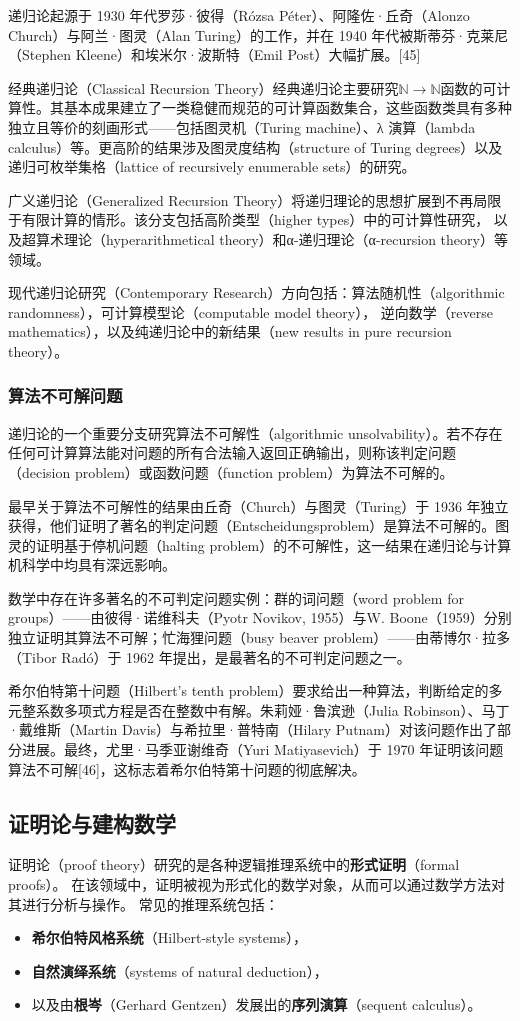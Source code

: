 递归论起源于 1930 年代罗莎·彼得（Rózsa Péter）、阿隆佐·丘奇（Alonzo Church）与阿兰·图灵（Alan Turing）的工作，并在 1940 年代被斯蒂芬·克莱尼（Stephen Kleene）和埃米尔·波斯特（Emil Post）大幅扩展。[45]

经典递归论（Classical Recursion Theory）经典递归论主要研究\(\mathbb{N} \to \mathbb{N}\)函数的可计算性。其基本成果建立了一类稳健而规范的可计算函数集合，这些函数类具有多种独立且等价的刻画形式——包括图灵机（Turing machine）、λ 演算（lambda calculus）等。更高阶的结果涉及图灵度结构（structure of Turing degrees）以及递归可枚举集格（lattice of recursively enumerable sets）的研究。

广义递归论（Generalized Recursion Theory）将递归理论的思想扩展到不再局限于有限计算的情形。该分支包括高阶类型（higher types）中的可计算性研究，
以及超算术理论（hyperarithmetical theory）和α-递归理论（α-recursion theory）等领域。

现代递归论研究（Contemporary Research）方向包括：算法随机性（algorithmic randomness），可计算模型论（computable model theory），
逆向数学（reverse mathematics），以及纯递归论中的新结果（new results in pure recursion theory）。
\subsubsection{算法不可解问题}
递归论的一个重要分支研究算法不可解性（algorithmic unsolvability）。若不存在任何可计算算法能对问题的所有合法输入返回正确输出，则称该判定问题（decision problem）或函数问题（function problem）为算法不可解的。

最早关于算法不可解性的结果由丘奇（Church）与图灵（Turing）于 1936 年独立获得，他们证明了著名的判定问题（Entscheidungsproblem）是算法不可解的。图灵的证明基于停机问题（halting problem）的不可解性，这一结果在递归论与计算机科学中均具有深远影响。

数学中存在许多著名的不可判定问题实例：群的词问题（word problem for groups）——由彼得·诺维科夫（Pyotr Novikov, 1955）与W. Boone（1959）分别独立证明其算法不可解；忙海狸问题（busy beaver problem）——由蒂博尔·拉多（Tibor Radó）于 1962 年提出，是最著名的不可判定问题之一。

希尔伯特第十问题（Hilbert’s tenth problem）要求给出一种算法，判断给定的多元整系数多项式方程是否在整数中有解。朱莉娅·鲁滨逊（Julia Robinson）、马丁·戴维斯（Martin Davis）与希拉里·普特南（Hilary Putnam）对该问题作出了部分进展。最终，尤里·马季亚谢维奇（Yuri Matiyasevich）于 1970 年证明该问题算法不可解[46]，这标志着希尔伯特第十问题的彻底解决。
\subsection{证明论与建构数学}
证明论（proof theory）研究的是各种逻辑推理系统中的\textbf{形式证明}（formal proofs）。  
在该领域中，证明被视为形式化的数学对象，从而可以通过数学方法对其进行分析与操作。  
常见的推理系统包括：
\begin{itemize}
  \item \textbf{希尔伯特风格系统}（Hilbert-style systems），
  \item \textbf{自然演绎系统}（systems of natural deduction），
  \item 以及由\textbf{根岑}（Gerhard Gentzen）发展出的\textbf{序列演算}（sequent calculus）。
\end{itemize}

